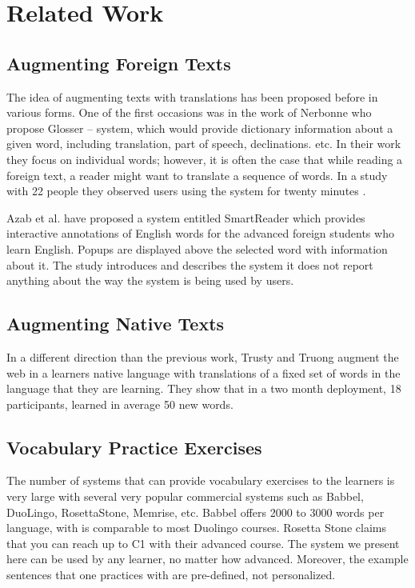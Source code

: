 
\newpage
\section{Related Work}


\subsection{Augmenting Foreign Texts}
The idea of augmenting texts with translations has been proposed before in various forms. One of the first occasions was in the work of Nerbonne \cite{Nerb99-Assistant} who propose Glosser -- system, which would provide dictionary information about a given word, including translation, part of speech, declinations. etc. In their work they focus on individual words; however, it is often the case that while reading a foreign text, a reader might want to translate a sequence of words. In a study with 22 people they observed users using the system for twenty minutes \cite{Dokter98-UserStudy}.

Azab et al. \cite{Azab13-nlp} have proposed a system entitled SmartReader which provides interactive annotations of English words for the advanced foreign students who learn English. Popups are displayed above the selected word with information about it. The study introduces and describes the system it does not report anything about the way the system is being used by users.

\subsection{Augmenting Native Texts}
In a different direction than the previous work, Trusty and Truong augment the web in a learners native language with translations of a fixed set of words in the language that they are learning\cite{Trus11web}. They show that in a two month deployment, 18 participants, learned in average 50 new words.

\subsection{Vocabulary Practice Exercises}
The number of systems that can provide vocabulary exercises to the learners is very large with several very popular commercial systems such as Babbel, DuoLingo, RosettaStone, Memrise, etc. Babbel offers 2000 to 3000 words per language, with is comparable to most Duolingo courses. Rosetta Stone claims that you can reach up to C1 with their advanced course. The system we present here can be used by any learner, no matter how advanced. Moreover, the example sentences that one practices with are pre-defined, not personalized.


